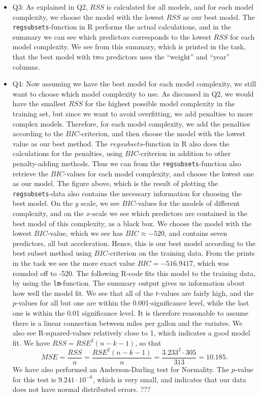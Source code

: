 \documentclass[]{article}
\providecommand{\tightlist}{%
  \setlength{\itemsep}{0pt}\setlength{\parskip}{0pt}}
\begin{document}
\begin{itemize}
\tightlist
\item
  Q3: As explained in Q2, \(RSS\) is calculated for all models, and for
  each model complexity, we choose the model with the lowest \(RSS\) as
  our best model. The \texttt{regsubsets}-function in R performs the
  actual calculations, and in the summary we can see which predictors
  corresponds to the lowest \(RSS\) for each model complexity. We see
  from this summary, which is printed in the task, that the best model
  with two predictors uses the ``weight'' and ``year'' columns.
\item
  Q4: Now assuming we have the best model for each model complexity, we
  still want to choose which model complexity to use. As discussed in
  Q2, we would have the smallest \(RSS\) for the highest possible model
  complexity in the training set, but since we want to avoid
  overfitting, we add penalties to more complex models. Therefore, for
  each model complexity, we add the penalties according to the
  \(BIC\)-criterion, and then choose the model with the lowest value as
  our best method. The \(regsubsets\)-function in R also does the
  calculations for the penalties, using \(BIC\)-criterion in addition to
  other penalty-adding methods. Thus we can from the
  \texttt{regsubsets}-function also retrieve the \(BIC\)-values for each
  model complexity, and choose the lowest one as our model. The figure
  above, which is the result of plotting the \texttt{regsubsets}-data
  also contains the necessary information for choosing the best model.
  On the \(y\) scale, we see \(BIC\)-values for the models of different
  complexity, and on the \(x\)-scale we see which predictors are
  contained in the best model of this complexity, as a black box. We
  choose the model with the lowest \(BIC\)-value, which we see has
  \(BIC\approx -520\), and contains seven predictors, all but
  acceleration. Hence, this is our best model according to the best
  subset method using \(BIC\)-criterion on the training data. From the
  prints in the task we see the more exact value \(BIC=-516.9417\),
  which was rounded off to -520. The following R-code fits this model to
  the training data, by using the \texttt{lm}-function. The summary
  output gives us information about how well the model fit. We see that
  all of the \(t\)-values are fairly high, and the \(p\)-values for all
  but one are within the 0.001-significance level, while the last one is
  within the 0.01 significance level. It is therefore reasonable to
  assume there is a linear connection between miles per gallon and the
  variates. We also see R-squared-values relatively close to 1, which
  indicates a good model fit. We have \(RSS=RSE^2(n-k-1)\), so that
  \[MSE=\frac{RSS}{n}=\frac{RSE^2(n-k-1)}{n}=\frac{3.233^2\cdot 305}{313}=10.185.\]
  We have also performed an Anderson-Darling test for Normality. The
  \(p\)-value for this test is \(9.241\cdot 10^{-6}\), which is very
  small, and indicates that our data does not have normal distributed
  errors. ???
\end{itemize}
\end{document}

